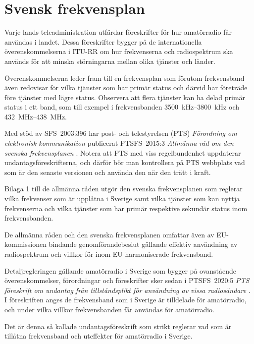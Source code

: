 \chapter{Svensk frekvensplan}
\label{svensk frekvensplan}

Varje lands teleadministration utfärdar föreskrifter för hur amatörradio får
användas i landet.
Dessa föreskrifter bygger på de internationella överenskommelserna i ITU-RR
\cite[ARTICLE 5]{ITU-RR} om hur frekvenserna och radiospektrum ska används för
att minska störningarna mellan olika tjänster och länder.

Överenskommelserna leder fram till en frekvensplan som förutom frekvensband även
redovisar för vilka tjänster som har primär status och därvid har företräde före
tjänster med lägre status.
Observera att flera tjänster kan ha delad primär status i ett band, som till
exempel i frekvensbanden \SIrange{3500}{3800}{\kilo\hertz} och
\SIrange{432}{438}{\mega\hertz}.

Med stöd av SFS~2003:396 har post- och telestyrelsen (PTS)
\emph{Förordning om elektronisk kommunikation} \cite{SFS2003:396}
publicerat PTSFS~2015:3 \emph{Allmänna råd om den svenska frekvensplanen}
\cite{PTSFS2015:3}.
Notera att PTS med viss regelbundenhet uppdaterar undantagsföreskrifterna,
och därför bör man kontrollera på PTS webbplats vad som är den senaste versionen
och använda den när den trätt i kraft.

Bilaga 1 till de allmänna råden utgör den svenska frekvensplanen som reglerar
vilka frekvenser som är upplåtna i Sverige samt vilka tjänster som kan nyttja
frekvenserna och vilka tjänster som har primär respektive sekundär status inom
frekvensbanden.

\newpage

De allmänna råden och den svenska frekvensplanen omfattar även av
EU-kommissionen bindande genomförandebeslut gällande effektiv användning av
radiospektrum och villkor för inom EU harmoniserade frekvensband.

Detaljregleringen gällande amatörradio i Sverige som bygger på ovanstående
överenskommelser, förordningar och föreskrifter sker sedan i PTSFS~2020:5
\emph{PTS föreskrift om undantag från tillståndsplikt för användning av vissa
  radiosändare} \cite{PTSFS2020:5}.
I föreskriften anges de frekvensband som i Sverige är tilldelade för
amatörradio, och under vilka villkor frekvensbanden får användas för
amatörradio.

Det är denna så kallade undantagsföreskrift som strikt reglerar vad som är
tillåtna frekvensband och uteffekter för amatörradio i Sverige.

